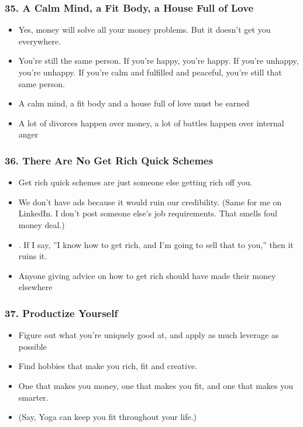 \begin{frame}[fragile]
\frametitle{35. A Calm Mind, a Fit Body, a House Full of Love}
\begin{itemize}
\item Yes, money will solve all your money problems. But it doesn't get you everywhere. 
\item You're still the same person.  If
you're happy, you're happy. If you're unhappy, you're unhappy. If you're calm and fulfilled and peaceful,
you're still that same person.
\item A calm mind, a  fit body and a house full of love must be earned
\item A lot of divorces happen over money, a lot of battles happen over internal anger
\end{itemize}
\end{frame}

\begin{frame}[fragile]
\frametitle{36. There Are No Get Rich Quick Schemes}
\begin{itemize}
\item Get rich quick schemes are just someone else getting rich off  you.
\item We don't have ads because it would ruin our credibility. (Same for me on LinkedIn. I don't post someone else's job requirements. That smells foul money deal.)
\item . If I say, ''I know how to get rich, and I'm going to sell that to you,'' then it ruins it.
\item Anyone giving advice on how to get rich should have made their money elsewhere
\end{itemize}
\end{frame}

\begin{frame}[fragile]
\frametitle{37. Productize Yourself}
\begin{itemize}
\item Figure out what you're uniquely good at, and apply as much leverage as possible
\item Find hobbies that make you rich, fit and creative.
\item One that makes you money, one that makes you  fit, and one that
makes you smarter. 
\item (Say, Yoga can keep you fit throughout your life.)
\end{itemize}
\end{frame}

